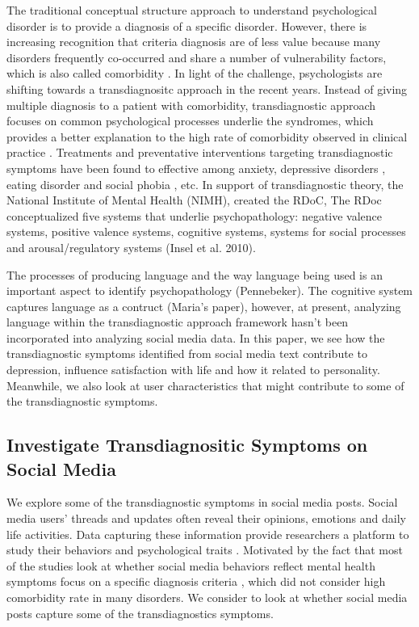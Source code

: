 The traditional conceptual structure approach to understand psychological disorder is to provide a diagnosis of a specific disorder. However, there is increasing recognition that criteria diagnosis are of less value because many disorders frequently co-occurred and share a number of vulnerability factors, which is also called comorbidity \cite{Kessler98,Hirschfeld99}. In light of the challenge, psychologists are shifting towards a transdiagnositc approach in the recent years. Instead of giving multiple diagnosis to a patient with comorbidity, transdiagnostic approach focuses on common psychological processes underlie the syndromes, which provides a better explanation to the high rate of comorbidity observed in clinical practice \cite{Harvey04}. Treatments and preventative interventions targeting transdiagnostic symptoms have been found to effective among anxiety, depressive disorders \cite{Collins09,Norton04}, eating disorder \cite{Fairburn03} and social phobia \cite{Freda00}, etc. In support of transdiagnostic theory, the National Institute of Mental Health (NIMH), created the RDoC, The RDoc conceptualized five systems that underlie psychopathology: negative valence systems, positive valence systems, cognitive systems, systems for social processes and arousal/regulatory systems (Insel et al. 2010). 

The processes of producing language and the way language being used is an important aspect to identify psychopathology (Pennebeker). The cognitive system captures language as a contruct (Maria's paper), however, at present, analyzing language within the transdiagnostic approach framework hasn't been incorporated into analyzing social media data. In this paper, we see how the transdiagnostic symptoms identified from social media text contribute to depression, influence satisfaction with life and how it related to personality. Meanwhile, we also look at user characteristics that might contribute to some of the transdiagnostic symptoms. 

\subsection{Investigate Transdiagnositic Symptoms on Social Media}
We explore some of the transdiagnostic symptoms in social media posts. Social media users' threads and updates often reveal their opinions, emotions and daily life activities. Data capturing these information provide researchers a platform to study their behaviors and psychological traits \cite{Kosinski13, Lushi}. Motivated by the fact that most of the studies look at whether social media behaviors reflect mental health symptoms focus on a specific diagnosis criteria \cite{munmun13, Aldarwish17, Hu17, Coppersmith15}, which did not consider high comorbidity rate in many disorders. We consider to look at whether social media posts capture some of the transdiagnostics symptoms.

